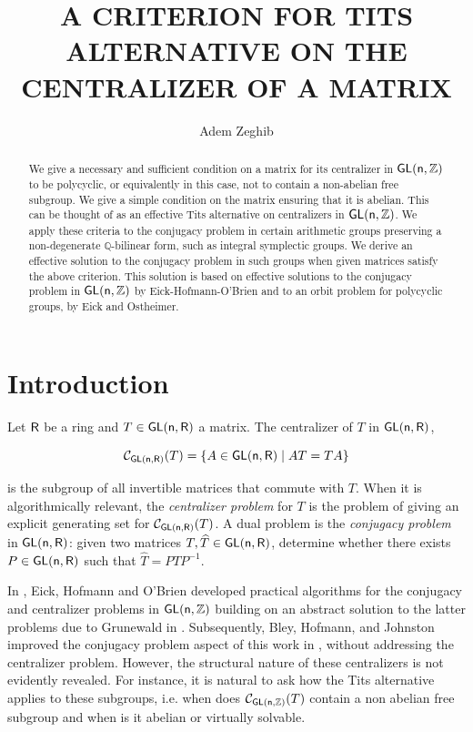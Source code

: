 \documentclass[a4paper,11pt]{article}
\theoremstyle{definition}
\def\r{{\sf{R}}}
\newcommand{\Z}{\mathbb Z}
\newcommand{\Q}{\mathbb Q}
\newcommand{\C}{\mathcal C}
\def \GL{\sf{GL}}
\begin{document}
 \date{}
\author{\small Adem Zeghib}




\title{{\small\textbf{A CRITERION FOR TITS ALTERNATIVE ON THE CENTRALIZER OF A MATRIX}}}
\maketitle


\begin{abstract}
We give a necessary and sufficient condition on a matrix for its  centralizer in $\GL(n,\Z)$ to be  polycyclic,  or equivalently in this case,  not to contain a non-abelian free subgroup. We give a simple condition on the matrix ensuring that it is abelian. This can be thought of as an effective Tits alternative on centralizers in  $\GL(n,\mathbb{Z})$.   We apply these criteria to the conjugacy problem in certain arithmetic groups preserving a non-degenerate $\Q$-bilinear form, such as integral symplectic groups. We derive an effective solution to the conjugacy problem in such groups when given matrices satisfy the above criterion. This solution is based on effective solutions to the conjugacy problem in $\GL(n,\Z)$ by Eick-Hofmann-O’Brien and to an orbit problem for polycyclic groups, by  Eick and Ostheimer.
\end{abstract}







\section{Introduction}

Let $\r$ be a ring and $T \in \GL(n, \mathbb{\r})$ a matrix. The centralizer of $T$ in  $\GL(n, \r)$,

$$\mathcal{C}_{\GL(n, \r)}(T) = \{ A \in \GL(n, \r) \mid \text{$AT=TA$} \}$$

is the subgroup of all invertible matrices that commute with $T$.
When it is algorithmically relevant, the \emph{centralizer problem} for $T$ is the problem of giving an explicit generating set for $\C_{\GL(n,\r)} (T)$.  A dual problem is the \emph{conjugacy problem} in $\GL(n,\r)$: given two matrices  $T, \widehat{T} \in \GL(n, \r)$, determine whether there exists $P \in \GL(n, \r)$ such that $\widehat{T} = PTP^{-1}$. 

In \cite{eick2019conjugacy}, Eick, Hofmann and O’Brien  developed practical algorithms for the conjugacy and centralizer problems in $\GL(n, \Z)$ building on an abstract solution to the latter problems due to Grunewald in \cite{grunewald1980solution}. Subsequently, Bley, Hofmann, and Johnston improved the conjugacy problem aspect of this work in \cite{bley2022computation}, without addressing the centralizer problem. However, the structural nature of these centralizers is not evidently revealed. For instance, it is natural to ask how the Tits alternative \cite{tits1972free} applies to these subgroups, i.e. when does $\C_{\GL(n,\Z)}(T)$ contain a non abelian free subgroup and when is it abelian or virtually solvable.
\end{document}
